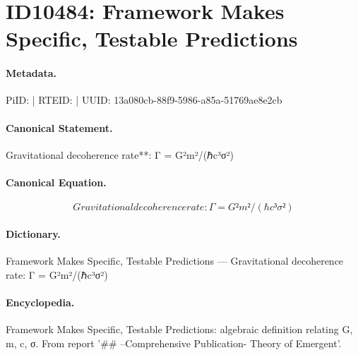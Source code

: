 \section*{ID10484: Framework Makes Specific, Testable Predictions}
\paragraph{Metadata.}
PiID:  | RTEID:  | UUID: 13a080cb-88f9-5986-a85a-51769ae8e2cb

\paragraph{Canonical Statement.}
Gravitational decoherence rate**: Γ = G²m²/(ℏc³σ²)

\paragraph{Canonical Equation.}
\[
Gravitational decoherence rate: Γ = G²m²/(ℏc³σ²)
\]

\paragraph{Dictionary.}
Framework Makes Specific, Testable Predictions — Gravitational decoherence rate: Γ = G²m²/(ℏc³σ²)

\paragraph{Encyclopedia.}
Framework Makes Specific, Testable Predictions: algebraic definition relating G, m, c, σ. From report '\#\# --Comprehensive Publication- Theory of Emergent'.
